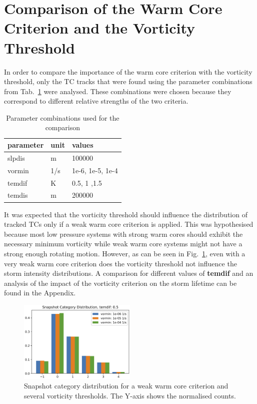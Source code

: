\section{Comparison of the Warm Core Criterion and the Vorticity Threshold}\label{sec:warmcore-var}
In order to compare the importance of the warm core criterion with the vorticity threshold, only the TC tracks that were found using the parameter combinations from Tab.~\ref{tab:vor-tem-comparison} were analysed. These combinations were chosen because they correspond to different relative strengths of the two criteria.

\begin{table}[!htb]
	\centering
	\begin{tabular}{|l|l|l|}
		\hline
		\textbf{parameter} & \textbf{unit} & \textbf{values}  \\ \hline
		slpdis             & m             & 100000           \\
		vormin             & 1/s           & 1e-6, 1e-5, 1e-4 \\
		temdif             & K             & 0.5, 1 ,1.5      \\
		temdis             & m             & 200000           \\ \hline
	\end{tabular}
	\caption{Parameter combinations used for the comparison}
	\label{tab:vor-tem-comparison}
\end{table}

It was expected that the vorticity threshold should influence the distribution of tracked TCs only if a weak warm core criterion is applied. This was hypothesised because most low pressure systems with strong warm cores should exhibit the necessary minimum vorticity while weak warm core systems might not have a strong enough rotating motion. However, as can be seen in Fig.~\ref{fig:temdif-vormin-comp}, even with a very weak warm core criterion does the vorticity threshold not influence the storm intensity distributions. A comparison for different values of \textbf{temdif} and an analysis of the impact of the vorticity criterion on the storm lifetime can be found in the Appendix.
\begin{figure}[!htb]
	\centering
	\includegraphics[width=0.5\textwidth]{img/curr_category_vortem05.png}
	\caption{Snapshot category distribution for a weak warm core criterion and several vorticity thresholds. The Y-axis shows the normalised counts.}
	\label{fig:temdif-vormin-comp}
\end{figure}

